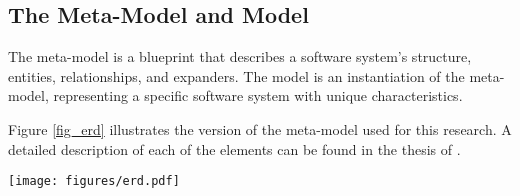 \subsection{The Meta-Model and Model} \label{sec_artifact_meta_model}

The meta-model is a blueprint that describes a software system's structure, entities,
relationships, and expanders. The model is an instantiation of the meta-model,
representing a specific software system with unique characteristics. 

Figure \ref{fig_erd} illustrates the version of the meta-model used for this research. A
detailed description of each of the elements can be found in the thesis of
\citeauthor{koks_convergence_2023} \cite[73]{koks_convergence_2023}.

\begin{figure*}[ht!]
    \centering
    \centerline{\texttt{[image: figures/erd.pdf]}}
    \caption[The meta-model represented as an Entity Relationship Diagram]{The meta-model represented as an Entity Relationship Diagram}
    \label{fig_erd}
\end{figure*}
